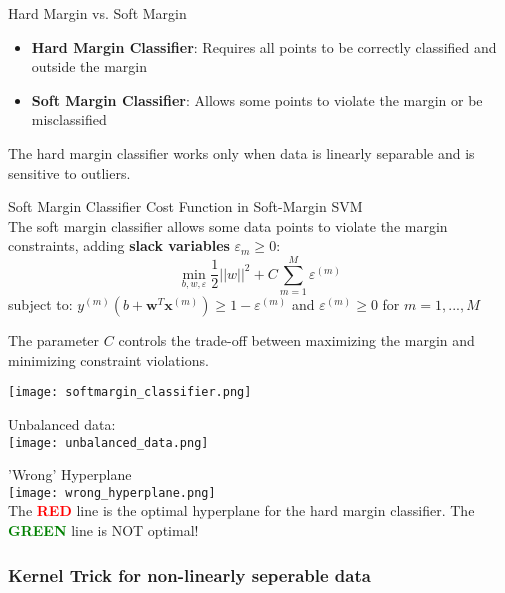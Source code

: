 \begin{concept}{Hard Margin vs. Soft Margin}
\begin{itemize}
    \item \textbf{Hard Margin Classifier}: Requires all points to be correctly classified and outside the margin
    \item \textbf{Soft Margin Classifier}: Allows some points to violate the margin or be misclassified
\end{itemize}
The hard margin classifier works only when data is linearly separable and is sensitive to outliers.
\end{concept}

\begin{definition}{Soft Margin Classifier} Cost Function in Soft-Margin SVM\\
The soft margin classifier allows some data points to violate the margin constraints, adding \textbf{slack variables} $\varepsilon_m \geq 0$:
\[\min_{b,w,\varepsilon} \frac{1}{2}||w||^2 + C\sum_{m=1}^{M}\varepsilon^{(m)}\]
subject to: $y^{(m)}(b + \mathbf{w}^T \mathbf{x}^{(m)}) \geq 1 - \varepsilon^{(m)}$ and $\varepsilon^{(m)} \geq 0$ for $m = 1,..., M$

The parameter $C$ controls the trade-off between maximizing the margin and minimizing constraint violations.
\end{definition}


\texttt{[image: softmargin\_classifier.png]}

\begin{remark}
    Unbalanced data:\\
    \texttt{[image: unbalanced\_data.png]}
\end{remark}

\multend

\begin{example2}{'Wrong' Hyperplane}\\
    \texttt{[image: wrong\_hyperplane.png]}\\
    The \textcolor{red}{\textbf{RED}} line is the optimal hyperplane for the hard margin classifier. The \textcolor{green}{\textbf{GREEN}} line is NOT optimal!
\end{example2}



\subsubsection{Kernel Trick for non-linearly seperable data}

